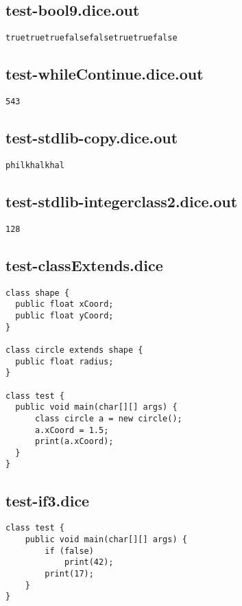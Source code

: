 \subsection{test-bool9.dice.out}
\begin{verbatim}
truetruetruefalsefalsetruetruefalse

\end{verbatim}
\pagebreak
\subsection{test-whileContinue.dice.out}
\begin{verbatim}
543
\end{verbatim}
\pagebreak
\subsection{test-stdlib-copy.dice.out}
\begin{verbatim}
philkhalkhal
\end{verbatim}
\pagebreak
\subsection{test-stdlib-integerclass2.dice.out}
\begin{verbatim}
128

\end{verbatim}
\pagebreak
\subsection{test-classExtends.dice}
\begin{verbatim}
class shape {
  public float xCoord;
  public float yCoord;
}

class circle extends shape {
  public float radius;
}

class test {
  public void main(char[][] args) {
      class circle a = new circle(); 
      a.xCoord = 1.5;
      print(a.xCoord);
  }
}
\end{verbatim}
\pagebreak
\subsection{test-if3.dice}
\begin{verbatim}
class test {
	public void main(char[][] args) {	
  		if (false) 
  			print(42);
  		print(17);
	}
}

\end{verbatim}
\pagebreak
